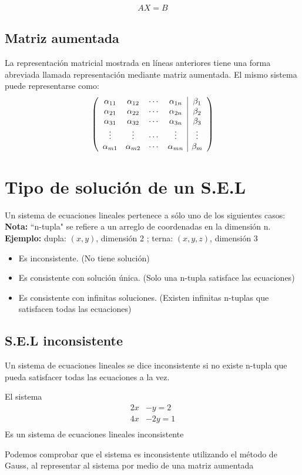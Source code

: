 \begin{align*}
AX=B
\end{align*}
\subsection{Matriz aumentada}
La representación matricial mostrada en líneas anteriores tiene una forma abreviada llamada representación mediante matriz aumentada. El mismo sistema puede representarse como:
\begin{align*}
\reducir{cccc|c}{
\alpha_{11} &\alpha_{12} &\cdots&\alpha_{1n}&\beta_1 \\
\alpha_{21} &\alpha_{22} &\cdots&\alpha_{2n}&\beta_2 \\
\alpha_{31} &\alpha_{32} &\cdots&\alpha_{3n}&\beta_3 \\
\vdots&\vdots&\cdots&\vdots&\vdots\\
\alpha_{m1} &\alpha_{m2} &\cdots&\alpha_{mn}&\beta_m\\
}
\end{align*}

\section{Tipo de solución de un S.E.L}
Un sistema de ecuaciones lineales pertenece a sólo uno de los siguientes casos:
~\\\textbf{Nota:} ``n-tupla" se refiere a un arreglo de coordenadas en la dimensión n.\\\textbf{Ejemplo: } dupla: $(x,y)$, dimensión 2 ; 
terna: $(x,y,z)$, dimensión 3
\begin{itemize}
\item Es inconsistente. (No tiene solución)
\item Es consistente con solución única. (Solo una n-tupla satisface las ecuaciones)
\item Es consistente con infinitas soluciones. (Existen infinitas n-tuplas que satisfacen todas las ecuaciones)
\end{itemize}
\subsection{S.E.L inconsistente}
Un sistema de ecuaciones lineales se dice inconsistente si no existe n-tupla que pueda satisfacer todas las ecuaciones a la vez. 
\begin{ejemplo}
El sistema 
\begin{align*}
2x&-y=2\\
4x&-2y=1\\
\end{align*}
Es un sistema de ecuaciones lineales inconsistente 
\end{ejemplo}
Podemos comprobar que el sistema es inconsistente utilizando el método de Gauss, al representar al sistema por medio de una matriz aumentada


